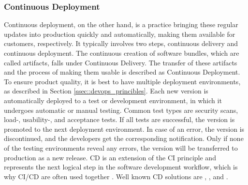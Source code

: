         \subsubsection{Continuous Deployment}
        Continuous deployment, on the other hand, is a practice bringing these regular updates into production quickly and automatically, making them available for customers, respectively. It typically involves two steps, continuous delivery and continuous deployment. The continuous creation of software bundles, which are called artifacts, falls under Continuous Delivery. The transfer of these artifacts and the process of making them usable is described as Continuous Deployment. To ensure product quality, it is best to have multiple deployment environments, as described in Section \ref{ssec::devops_princibles}. Each new version is automatically deployed to a test or development environment, in which it undergoes automatic or manual testing. Common test types are security scans, load-, usability-, and acceptance tests. If all tests are successful, the version is promoted to the next deployment environment. In case of an error, the version is discontinued, and the developers get the corresponding notification. Only if none of the testing environments reveal any errors, the version will be transferred to production as a new release. \ac{CD} is an extension of the \ac{CI} principle and represents the next logical step in the software development workflow, which is why \ac{CI}/\ac{CD} are often used together \cite{azuredevops}. Well known \ac{CD} solutions are , ,  and .


